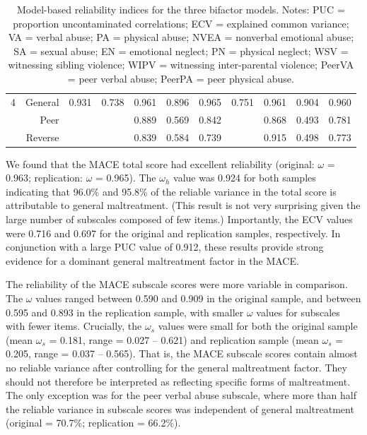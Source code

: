 \documentclass[letterpaper,man,natbib,noextraspace,floatsintext,longtable]{apa6}
\begin{document}
\begin{table}[t!]
\begin{tabular*}{\textwidth}{crccccccccc}
\midrule
4 & General &  0.931 & 0.738 &  0.961 &   0.896 &  0.965 & 0.751 & 0.961 & 0.904 & 0.960 \\
& Peer      &        &       &  0.889 &   0.569 &  0.842 &       & 0.868 & 0.493 & 0.781 \\
& Reverse   &        &       &  0.839 &   0.584 &  0.739 &       & 0.915 & 0.498 & 0.773 \\
\bottomrule
\end{tabular*}
\captionsetup{width=1.\textwidth}
\caption{\normalfont Model-based reliability indices for the three bifactor models. Notes: PUC = proportion uncontaminated correlations; ECV = explained common variance; VA = verbal abuse; PA = physical abuse; NVEA = nonverbal emotional abuse; SA = sexual abuse; EN = emotional neglect; PN = physical neglect; WSV = witnessing sibling violence; WIPV = witnessing inter-parental violence; PeerVA = peer verbal abuse; PeerPA = peer physical abuse.}
\label{table:reliability}
\end{table}

We found that the MACE total score had excellent reliability (original: $\omega$ = 0.963; replication: $\omega$ = 0.965). The $\omega_h$ value was 0.924 for both samples indicating that 96.0\% and 95.8\% of the reliable variance in the total score is attributable to general maltreatment. (This result is not very surprising given the large number of subscales composed of few items.) Importantly, the ECV values were 0.716 and 0.697 for the original and replication samples, respectively. In conjunction with a large PUC value of 0.912, these results provide strong evidence for a dominant general maltreatment factor in the MACE. 

The reliability of the MACE subscale scores were more variable in comparison. The $\omega$ values ranged between 0.590 and 0.909 in the original sample, and between 0.595 and 0.893 in the replication sample, with smaller $\omega$ values for subscales with fewer items. Crucially, the $\omega_s$ values were small for both the original sample (mean $\omega_s$ = 0.181, range = 0.027 -- 0.621) and replication sample (mean $\omega_s$ = 0.205, range = 0.037 -- 0.565). That is, the MACE subscale scores contain almost no reliable variance after controlling for the general maltreatment factor. They should not therefore be interpreted as reflecting specific forms of maltreatment. The only exception was for the peer verbal abuse subscale, where more than half the reliable variance in subscale scores was independent of general maltreatment (original = 70.7\%; replication = 66.2\%).
\end{document}
